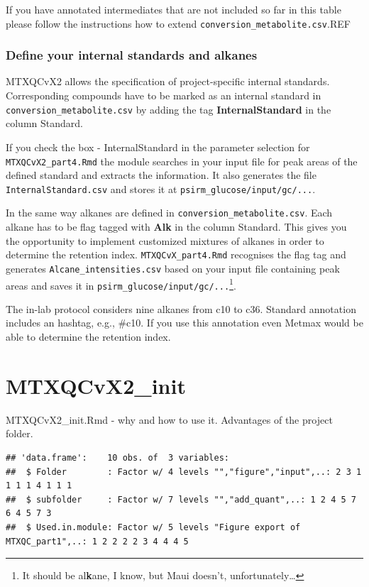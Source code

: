 \documentclass[]{book}
\let\rmarkdownfootnote\footnote%
\def\footnote{\protect\rmarkdownfootnote}
\theoremstyle{definition}
\theoremstyle{definition}
\theoremstyle{definition}
\theoremstyle{remark}
\begin{document}
If you have annotated intermediates that are not included so far in this
table please follow the instructions how to extend
\texttt{conversion\_metabolite.csv}.REF

\subsection{Define your internal standards and
alkanes}\label{define-your-internal-standards-and-alkanes}

MTXQCvX2 allows the specification of project-specific internal
standards. Corresponding compounds have to be marked as an internal
standard in \texttt{conversion\_metabolite.csv} by adding the tag
\textbf{InternalStandard} in the column Standard.

If you check the box - InternalStandard in the parameter selection for
\texttt{MTXQCvX2\_part4.Rmd} the module searches in your input file for
peak areas of the defined standard and extracts the information. It also
generates the file \texttt{InternalStandard.csv} and stores it at
\texttt{psirm\_glucose/input/gc/...}.

In the same way alkanes are defined in
\texttt{conversion\_metabolite.csv}. Each alkane has to be flag tagged
with \textbf{Alk} in the column Standard. This gives you the opportunity
to implement customized mixtures of alkanes in order to determine the
retention index. \texttt{MTXQCvX\_part4.Rmd} recognises the flag tag and
generates \texttt{Alcane\_intensities.csv} based on your input file
containing peak areas and saves it in
\texttt{psirm\_glucose/input/gc/...}\footnote{It should be
  al\textbf{k}ane, I know, but Maui doesn't, unfortunately\ldots{}}.

The in-lab protocol considers nine alkanes from c10 to c36. Standard
annotation includes an hashtag, e.g., \#c10. If you use this annotation
even Metmax would be able to determine the retention index.

\chapter{MTXQCvX2\_init}\label{init}

MTXQCvX2\_init.Rmd - why and how to use it. Advantages of the project
folder.

\begin{verbatim}
## 'data.frame':    10 obs. of  3 variables:
##  $ Folder        : Factor w/ 4 levels "","figure","input",..: 2 3 1 1 1 1 4 1 1 1
##  $ subfolder     : Factor w/ 7 levels "","add_quant",..: 1 2 4 5 7 6 4 5 7 3
##  $ Used.in.module: Factor w/ 5 levels "Figure export of MTXQC_part1",..: 1 2 2 2 2 3 4 4 4 5
\end{verbatim}
\end{document}
